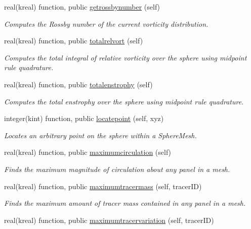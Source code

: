 \begin{DoxyCompactItemize}
real(kreal) function, public \hyperlink{group__SphereMesh_ga328b7708b010b001ba36e802abb3c863}{getrossbynumber} (self)
\begin{DoxyCompactList}\small\item\em Computes the Rossby number of the current vorticity distribution. \end{DoxyCompactList}\item 
real(kreal) function, public \hyperlink{group__SphereMesh_gabe01464cd105cc5c2f2d2c577bb3eea2}{totalrelvort} (self)
\begin{DoxyCompactList}\small\item\em Computes the total integral of relative vorticity over the sphere using midpoint rule quadrature. \end{DoxyCompactList}\item 
real(kreal) function, public \hyperlink{group__SphereMesh_ga3bbd7e4f63fe3cffaff0220681c612d4}{totalenstrophy} (self)
\begin{DoxyCompactList}\small\item\em Computes the total enstrophy over the sphere using midpoint rule quadrature. \end{DoxyCompactList}\item 
integer(kint) function, public \hyperlink{group__SphereMesh_ga7d024751a0858a280b313d29f360c973}{locatepoint} (self, xyz)
\begin{DoxyCompactList}\small\item\em Locates an arbitrary point on the sphere within a Sphere\+Mesh. \end{DoxyCompactList}\item 
real(kreal) function, public \hyperlink{group__SphereMesh_ga6686ad6af0289f6a4fb2fc33c8aaaec0}{maximumcirculation} (self)
\begin{DoxyCompactList}\small\item\em Finds the maximum magnitude of circulation about any panel in a mesh. \end{DoxyCompactList}\item 
real(kreal) function, public \hyperlink{group__SphereMesh_ga5e91a046c4930eb535d416ecd186d642}{maximumtracermass} (self, tracer\+I\+D)
\begin{DoxyCompactList}\small\item\em Finds the maximum amount of tracer mass contained in any panel in a mesh. \end{DoxyCompactList}\item 
real(kreal) function, public \hyperlink{group__SphereMesh_ga6f36560d3412a7d7e4cfa5befdb7533a}{maximumtracervariation} (self, tracer\+I\+D)

\end{DoxyCompactItemize}
